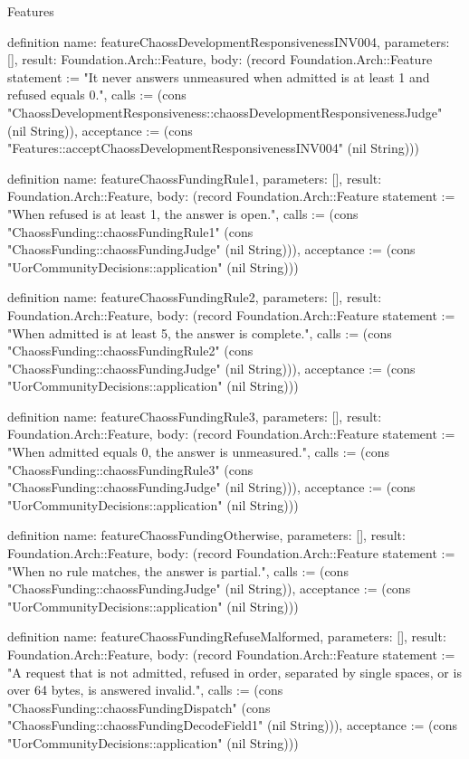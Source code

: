 \begin{lexlean}{Features}
\begin{semanticmodule}
definition{
  name: featureChaossDevelopmentResponsivenessINV004,
  parameters: [],
  result: Foundation.Arch::Feature,
  body: (record Foundation.Arch::Feature {statement := "It never answers unmeasured when admitted is at least 1 and refused equals 0.", calls := (cons "ChaossDevelopmentResponsiveness::chaossDevelopmentResponsivenessJudge" (nil String)), acceptance := (cons "Features::acceptChaossDevelopmentResponsivenessINV004" (nil String))})
}

definition{
  name: featureChaossFundingRule1,
  parameters: [],
  result: Foundation.Arch::Feature,
  body: (record Foundation.Arch::Feature {statement := "When refused is at least 1, the answer is open.", calls := (cons "ChaossFunding::chaossFundingRule1" (cons "ChaossFunding::chaossFundingJudge" (nil String))), acceptance := (cons "UorCommunityDecisions::application" (nil String))})
}

definition{
  name: featureChaossFundingRule2,
  parameters: [],
  result: Foundation.Arch::Feature,
  body: (record Foundation.Arch::Feature {statement := "When admitted is at least 5, the answer is complete.", calls := (cons "ChaossFunding::chaossFundingRule2" (cons "ChaossFunding::chaossFundingJudge" (nil String))), acceptance := (cons "UorCommunityDecisions::application" (nil String))})
}

definition{
  name: featureChaossFundingRule3,
  parameters: [],
  result: Foundation.Arch::Feature,
  body: (record Foundation.Arch::Feature {statement := "When admitted equals 0, the answer is unmeasured.", calls := (cons "ChaossFunding::chaossFundingRule3" (cons "ChaossFunding::chaossFundingJudge" (nil String))), acceptance := (cons "UorCommunityDecisions::application" (nil String))})
}

definition{
  name: featureChaossFundingOtherwise,
  parameters: [],
  result: Foundation.Arch::Feature,
  body: (record Foundation.Arch::Feature {statement := "When no rule matches, the answer is partial.", calls := (cons "ChaossFunding::chaossFundingJudge" (nil String)), acceptance := (cons "UorCommunityDecisions::application" (nil String))})
}

definition{
  name: featureChaossFundingRefuseMalformed,
  parameters: [],
  result: Foundation.Arch::Feature,
  body: (record Foundation.Arch::Feature {statement := "A request that is not admitted, refused in order, separated by single spaces, or is over 64 bytes, is answered invalid.", calls := (cons "ChaossFunding::chaossFundingDispatch" (cons "ChaossFunding::chaossFundingDecodeField1" (nil String))), acceptance := (cons "UorCommunityDecisions::application" (nil String))})
}


\end{semanticmodule}
\end{lexlean}
